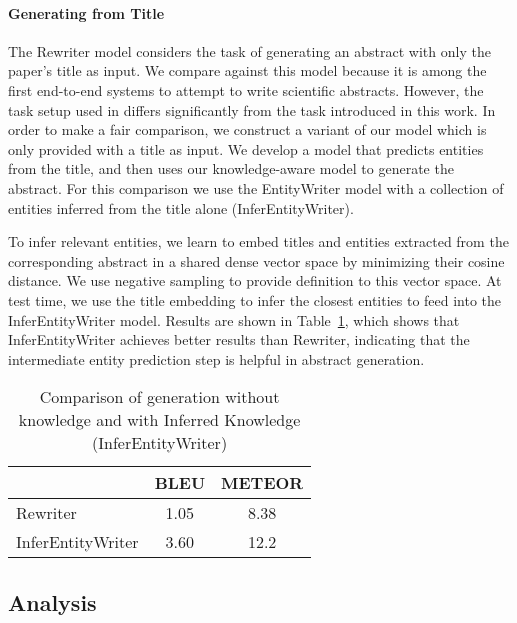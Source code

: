 \documentclass[11pt,a4paper]{article}
\begin{document}
\paragraph{Generating from Title} 
The Rewriter model \cite{wang2018paper} considers the task of generating an abstract with only the paper's title as input. 
We compare against this model because it is among the first end-to-end systems to attempt to write scientific abstracts. 
However, the task setup used in \citet{wang2018paper} differs significantly from the task introduced in this work.
In order to make a fair comparison, we construct a variant of our model which is only provided with a title as input. We develop a model that predicts entities from the title, and then uses our knowledge-aware model to generate the abstract. 
For this comparison we use the EntityWriter model with a collection of entities inferred from the title alone (InferEntityWriter).

 
To infer relevant entities, we learn to embed titles and entities extracted from the corresponding abstract in a shared dense vector space by minimizing their cosine distance.
We use negative sampling to provide definition to this vector space. 
At test time, we use the title embedding to infer the  closest entities to feed into the InferEntityWriter model. 
Results are shown in Table~\ref{rewritvsseq}, which shows that InferEntityWriter achieves  better results than Rewriter, indicating that the intermediate entity prediction step is helpful in abstract generation. 

\begin{table} \begin{small}
\begin{center}
\begin{tabular}{lcc}
     & BLEU & METEOR \\ \hline
    Rewriter & 1.05 & 8.38 \\
    InferEntityWriter & 3.60 & 12.2  \\ \hline
\end{tabular}
\caption{Comparison of generation without knowledge and with Inferred Knowledge (InferEntityWriter)}
\label{rewritvsseq}
\end{center}\end{small}
\end{table}

\subsection{Analysis}
\end{document}
